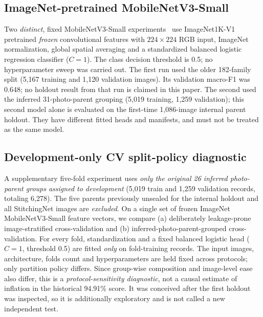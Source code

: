 \documentclass[conference,a4paper]{IEEEtran}
\begin{document}
\subsection{ImageNet-pretrained MobileNetV3-Small}
Two \emph{distinct}, fixed MobileNetV3-Small experiments~\cite{mobilenet} use ImageNet1K-V1 pretrained \emph{frozen} convolutional features with $224\times224$ RGB input, ImageNet normalization, global spatial averaging and a standardized balanced logistic regression classifier ($C=1$). The class decision threshold is 0.5; no hyperparameter sweep was carried out. The first run used the older 182-family split (5,167 training and 1,120 validation images). Its validation macro-F1 was 0.648; no holdout result from that run is claimed in this paper. The second used the inferred 31-photo-parent grouping (5,019 training, 1,259 validation); this second model alone is evaluated on the first-time 1,086-image internal parent holdout. They have different fitted heads and manifests, and must not be treated as the same model.

\subsection{Development-only CV split-policy diagnostic}
A supplementary five-fold experiment uses \emph{only the original 26 inferred photo-parent groups assigned to development} (5,019 train and 1,259 validation records, totaling 6,278). The five parents previously unsealed for the internal holdout and all StitchingNet images are \emph{excluded}. On a single set of frozen ImageNet MobileNetV3-Small feature vectors, we compare (a) deliberately leakage-prone image-stratified cross-validation and (b) inferred-photo-parent-grouped cross-validation. For every fold, standardization and a fixed balanced logistic head ($C=1$, threshold 0.5) are fitted \emph{only} on fold-training records. The input images, architecture, folds count and hyperparameters are held fixed across protocols; only partition policy differs. Since group-wise composition and image-level ease also differ, this is a \emph{protocol-sensitivity diagnostic}, not a causal estimate of inflation in the historical 94.91\% score. It was conceived after the first holdout was inspected, so it is additionally exploratory and is not called a new independent test.
\end{document}
